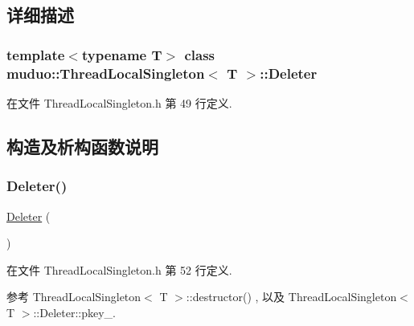 \subsection{详细描述}
\subsubsection*{template$<$typename T$>$\newline
class muduo\+::\+Thread\+Local\+Singleton$<$ T $>$\+::\+Deleter}



在文件 Thread\+Local\+Singleton.\+h 第 49 行定义.



\subsection{构造及析构函数说明}
\mbox{\label{classmuduo_1_1ThreadLocalSingleton_1_1Deleter_aaf39a259c3fafa94424594d8a628e168}} 
\subsubsection{\texorpdfstring{Deleter()}{Deleter()}}
{\footnotesize\ttfamily \hyperlink{classmuduo_1_1ThreadLocalSingleton_1_1Deleter}{Deleter} (\begin{DoxyParamCaption}{ }\end{DoxyParamCaption})\hspace{0.3cm}{\ttfamily [inline]}}



在文件 Thread\+Local\+Singleton.\+h 第 52 行定义.



参考 Thread\+Local\+Singleton$<$ T $>$\+::destructor() , 以及 Thread\+Local\+Singleton$<$ T $>$\+::\+Deleter\+::pkey\+\_\+.

